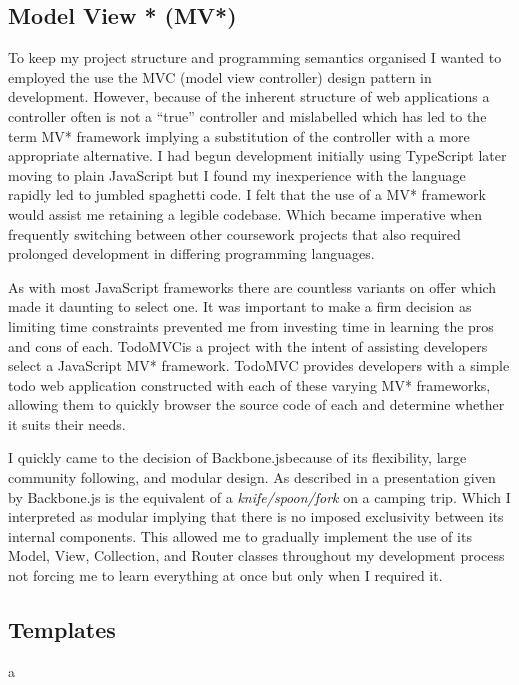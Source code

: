 \documentclass[final]{cmpreport}
\begin{document}
\subsection{Model View * (MV*)}
To keep my project structure and programming semantics organised I wanted to employed the use the MVC (model view controller) design pattern in development. However, because of the inherent structure of web applications a controller often is not a ``true'' controller and mislabelled which has led to the term MV* framework implying a substitution of the controller with a more appropriate alternative. I had begun development initially using TypeScript later moving to plain JavaScript but I found my inexperience with the language rapidly led to jumbled spaghetti code. I felt that the use of a MV* framework would assist me retaining a legible codebase.  Which became imperative when frequently switching between other coursework projects that also required prolonged development in differing programming languages.

As with most JavaScript frameworks there are countless variants on offer which made it daunting to select one. It was important to make a firm decision as limiting time constraints prevented me from investing time in learning the pros and cons of each. TodoMVC\footnotemark is a project with the intent of assisting developers select a JavaScript MV* framework. TodoMVC provides developers with a simple todo web application constructed with each of these varying MV* frameworks, allowing them to quickly browser the source code of each and determine whether it suits their needs.

I quickly came to the decision of Backbone.js\footnotemark because of its flexibility, large community following, and modular design. As described in a presentation given by \citet{Bull} Backbone.js is the equivalent of a \textit{knife/spoon/fork} on a camping trip. Which I interpreted as modular implying that there is no imposed exclusivity between its internal components. This allowed me to gradually implement the use of its Model, View, Collection, and Router classes throughout my development process not forcing me to learn everything at once but only when I required it.


\subsection{Templates}
a
\end{document}
